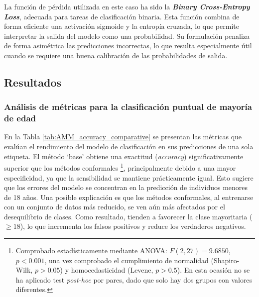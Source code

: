La función de pérdida utilizada en este caso ha sido la \textbf{\textit{Binary Cross-Entropy Loss}}, adecuada para tareas de clasificación binaria. Esta función combina de forma eficiente una activación sigmoide y la entropía cruzada, lo que permite interpretar la salida del modelo como una probabilidad. Su formulación penaliza de forma asimétrica las predicciones incorrectas, lo que resulta especialmente útil cuando se requiere una buena calibración de las probabilidades de salida.

\subsection{Resultados}

\subsubsection{Análisis de métricas para la clasificación puntual de mayoría de edad}

En la Tabla \ref{tab:AMM_accuracy_comparative} se presentan las métricas que evalúan el rendimiento del modelo de clasificación en sus predicciones de una sola etiqueta.
El método `base' obtiene una exactitud (\textit{accuracy}) significativamente superior que los métodos conformales%
\footnote{
    Comprobado estadísticamente mediante ANOVA: $F(2, 27) = 9.6850$, $p < 0.001$, una vez comprobado el cumplimiento de normalidad (Shapiro-Wilk, $p>0.05$) y homocedasticidad (Levene, $p>0.5$). En esta ocasión no se ha aplicado test \textit{post-hoc} por pares, dado que solo hay dos grupos con valores diferentes. 
}, 
principalmente debido a una mayor especificidad, ya que la sensibilidad se mantiene prácticamente igual. Esto sugiere que los errores del modelo se concentran en la predicción de individuos menores de 18 años. Una posible explicación es que los métodos conformales, al entrenarse con un conjunto de datos más reducido, se ven aún más afectados por el desequilibrio de clases. Como resultado, tienden a favorecer la clase mayoritaria ($\ge 18$), lo que incrementa los falsos positivos y reduce los verdaderos negativos.

